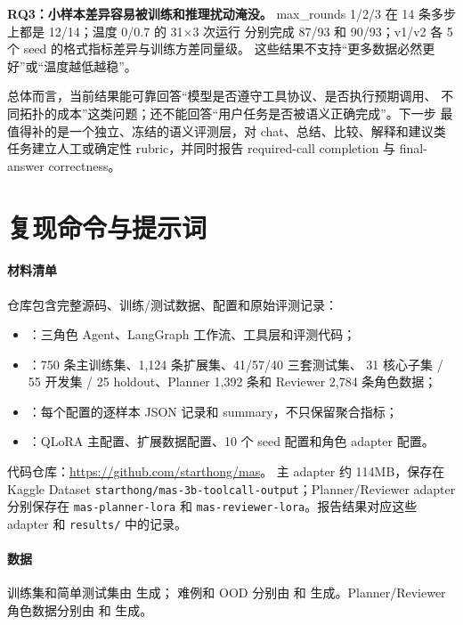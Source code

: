 \documentclass[UTF8,a4paper,12pt]{ctexart}
\begin{document}
\textbf{RQ3：小样本差异容易被训练和推理扰动淹没。}
max\_rounds 1/2/3 在 14 条多步上都是 12/14；温度 0/0.7 的 31×3 次运行
分别完成 87/93 和 90/93；v1/v2 各 5 个 seed 的格式指标差异与训练方差同量级。
这些结果不支持“更多数据必然更好”或“温度越低越稳”。

总体而言，当前结果能可靠回答“模型是否遵守工具协议、是否执行预期调用、
不同拓扑的成本”这类问题；还不能回答“用户任务是否被语义正确完成”。下一步
最值得补的是一个独立、冻结的语义评测层，对 chat、总结、比较、解释和建议类
任务建立人工或确定性 rubric，并同时报告 required-call completion 与
final-answer correctness。

\clearpage
\appendix
\section{复现命令与提示词}

\paragraph{材料清单}
仓库包含完整源码、训练/测试数据、配置和原始评测记录：
\begin{itemize}
  \item {}：三角色 Agent、LangGraph 工作流、工具层和评测代码；
  \item {}：750 条主训练集、1,124 条扩展集、41/57/40 三套测试集、
        31 核心子集 / 55 开发集 / 25 holdout、Planner 1,392 条和 Reviewer 2,784 条角色数据；
  \item {}：每个配置的逐样本 JSON 记录和 summary，不只保留聚合指标；
  \item {}：QLoRA 主配置、扩展数据配置、10 个 seed 配置和角色 adapter 配置。
\end{itemize}
代码仓库：\url{https://github.com/starthong/mas}。
主 adapter 约 114MB，保存在 Kaggle Dataset
\texttt{starthong/mas-3b-toolcall-output}；Planner/Reviewer adapter 分别保存在
\texttt{mas-planner-lora} 和 \texttt{mas-reviewer-lora}。报告结果对应这些
adapter 和 \texttt{results/} 中的记录。

\paragraph{数据}
训练集和简单测试集由  生成；
难例和 OOD 分别由  和
 生成。Planner/Reviewer 角色数据分别由
 和
 生成。
\end{document}
